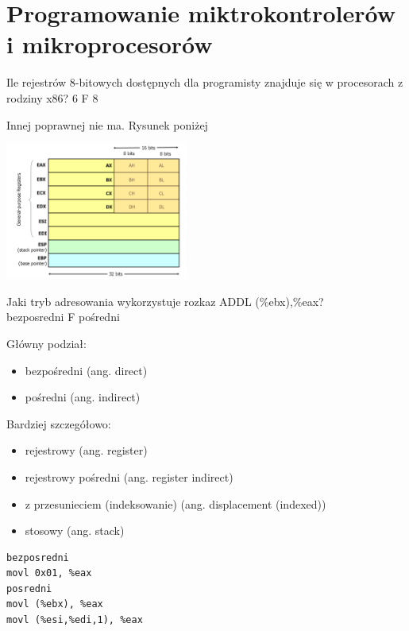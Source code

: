\setcounter{chapter}{12}
\chapter{Programowanie miktrokontrolerów i mikroprocesorów}
\PartialToc
\setcounter{section}{215}

\answer
{Ile rejestrów 8-bitowych dostępnych dla programisty znajduje się w procesorach z rodziny x86?}
{6}
{F}
{8}
{
	Innej poprawnej nie ma. Rysunek poniżej
	\begin{center}
		\includegraphics[width=6cm]{13/img/x86-registers.png}
	\end{center}
}
\answer
{Jaki tryb adresowania wykorzystuje rozkaz ADDL (\%ebx),\%eax?\\}
{bezposredni}
{F}
{pośredni}
{
Główny podział:
\begin{itemize}
	\item bezpośredni (ang. direct)
	\item pośredni (ang. indirect)
\end{itemize}
Bardziej szczegółowo:
\begin{itemize}
	\item rejestrowy (ang. register)
	\item rejestrowy pośredni (ang. register indirect)
	\item z przesunieciem (indeksowanie) (ang. displacement (indexed))
	\item stosowy (ang. stack)
\end{itemize}
}
\begin{lstlisting}
bezposredni
movl 0x01, %eax
posredni
movl (%ebx), %eax
movl (%esi,%edi,1), %eax

\end{lstlisting}
\answer
